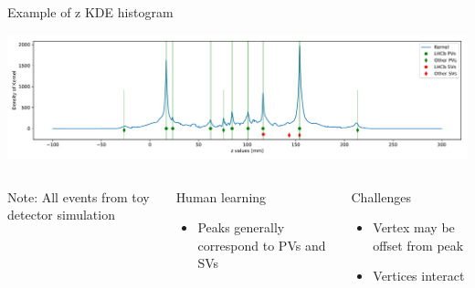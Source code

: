 \begin{frame}{Example of z KDE histogram}
\begin{center}
    \includegraphics[width=\textwidth, trim=50 30 50 30]{images/kernel_and_pvs.pdf}
\end{center}
\begin{columns}[b]

    \textcolor{lhcbRed}{Note: All events from toy detector simulation}

    \begin{block}{Human learning}
    \begin{itemize}
        \item Peaks generally correspond to PVs and SVs
    \end{itemize}
    \end{block}

    \begin{block}{Challenges}
    \begin{itemize}
        \item Vertex may be offset from peak
        \item Vertices interact
    \end{itemize}
    \end{block}
\end{columns}
\end{frame}
